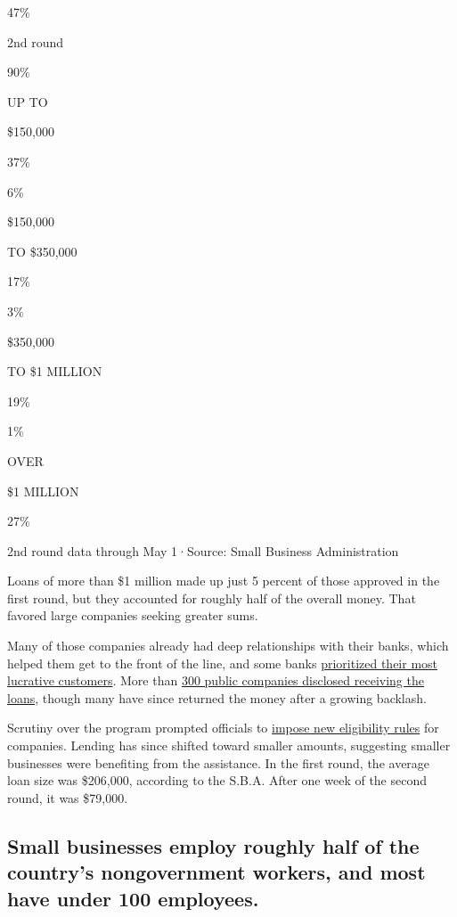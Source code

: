 47\%

2nd round

90\%

UP TO

\$150,000

37\%

6\%

\$150,000

TO \$350,000

17\%

3\%

\$350,000

TO \$1 MILLION

19\%

1\%

OVER

\$1 MILLION

27\%

2nd round data through May 1·Source: Small Business Administration

Loans of more than \$1 million made up just 5 percent of those approved
in the first round, but they accounted for roughly half of the overall
money. That favored large companies seeking greater sums.

Many of those companies already had deep relationships with their banks,
which helped them get to the front of the line, and some banks
\href{https://www.nytimes.com/2020/04/22/business/sba-loans-ppp-coronavirus.html}{prioritized
their most lucrative customers}. More than
\href{https://www.nytimes.com/2020/05/04/business/live-stock-market-coronavirus.html\#link-48f11fd9}{300
public companies disclosed receiving the loans}, though many have since
returned the money after a growing backlash.

Scrutiny over the program prompted officials to
\href{https://www.nytimes.com/2020/04/28/us/politics/coronavirus-treasury-payment-protection-program.html}{impose
new eligibility rules} for companies. Lending has since shifted toward
smaller amounts, suggesting smaller businesses were benefiting from the
assistance. In the first round, the average loan size was \$206,000,
according to the S.B.A. After one week of the second round, it was
\$79,000.

\hypertarget{small-businesses-employ-roughly-half-of-the-countrys-nongovernment-workers-and-most-have-under-100-employees}{%
\subsection{Small businesses employ roughly half of the country's
nongovernment workers, and most have under 100
employees.}\label{small-businesses-employ-roughly-half-of-the-countrys-nongovernment-workers-and-most-have-under-100-employees}}

